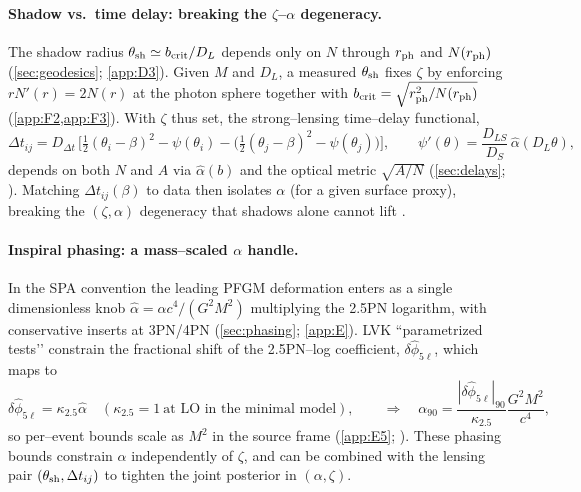 \documentclass{iopjournal}
\begin{document}
\paragraph{Shadow vs.\ time delay: breaking the $\zeta$–$\alpha$ degeneracy.}
The shadow radius $\theta_{\rm sh}\simeq b_{\rm crit}/D_L$ depends only on $N$ through $r_{\rm ph}$ and $N(r_{\rm ph})$ (\cref{sec:geodesics}; \cref{app:D3}). Given $M$ and $D_L$, a measured $\theta_{\rm sh}$ fixes $\zeta$ by enforcing $rN'(r)=2N(r)$ at the photon sphere together with $b_{\rm crit}=\sqrt{r_{\rm ph}^2/N(r_{\rm ph})}$ (\cref{app:F2,app:F3}). With $\zeta$ thus set, the strong–lensing time–delay functional,
\[
\Delta t_{ij}=D_{\Delta t}\,\Big[\tfrac12(\theta_i-\beta)^2-\psi(\theta_i)-\big(\tfrac12(\theta_j-\beta)^2-\psi(\theta_j)\big)\Big],\qquad
\psi'(\theta)=\frac{D_{LS}}{D_S}\,\hat\alpha(D_L\theta),
\]
depends on both $N$ and $A$ via $\hat\alpha(b)$ and the optical metric $\sqrt{A/N}$ (\cref{sec:delays}; ). Matching $\Delta t_{ij}(\beta)$ to data then isolates $\alpha$ (for a given surface proxy), breaking the $(\zeta,\alpha)$ degeneracy that shadows alone cannot lift \cite{SchneiderEhlersFalco1992,Perlick2004LRR}.

\paragraph{Inspiral phasing: a mass–scaled $\alpha$ handle.}
In the SPA convention the leading PFGM deformation enters as a single dimensionless knob $\widehat\alpha=\alpha c^{4}/(G^{2}M^{2})$ multiplying the 2.5PN logarithm, with conservative inserts at 3PN/4PN (\cref{sec:phasing}; \cref{app:E}). LVK ``parametrized tests’’ constrain the fractional shift of the 2.5PN–log coefficient, $\delta\hat\phi_{5\ell}$, which maps to
\[
\delta\hat\phi_{5\ell}=\kappa_{2.5}\widehat\alpha\quad(\kappa_{2.5}=1\ \text{at LO in the minimal model}),
\qquad
\Rightarrow\quad
\alpha_{90}=\frac{|\delta\hat\phi_{5\ell}|_{90}}{\kappa_{2.5}}\frac{G^{2}M^{2}}{c^{4}},
\]
so per–event bounds scale as $M^{2}$ in the source frame (\cref{app:E5}; \cite{CutlerFlanagan1994,SathyaprakashSchutz2009,Blanchet2014LRR}). These phasing bounds constrain $\alpha$ independently of $\zeta$, and can be combined with the lensing pair $(\theta_{\rm sh},\Delta t_{ij})$ to tighten the joint posterior in $(\alpha,\zeta)$.
\end{document}
